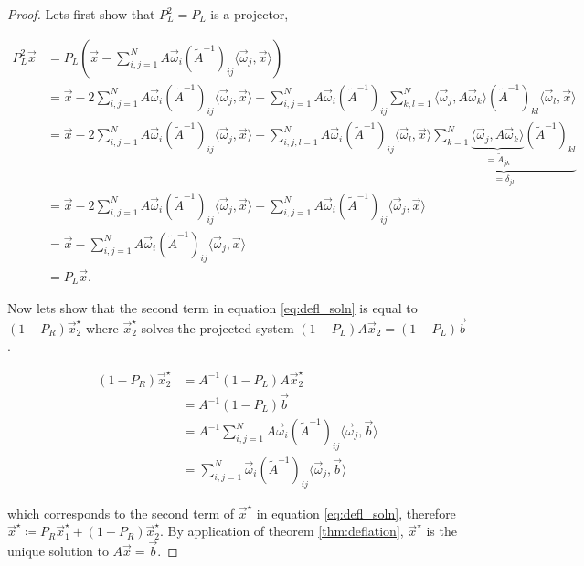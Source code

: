 \documentclass{article}
\theoremstyle{plain} %
\theoremstyle{convention} %
\theoremstyle{remark} %
\numberwithin{equation}{section}
\begin{document}
\begin{proof}

Lets first show that $P_L^2 = P_L$ is a projector,

\begin{align*}
    P_L^2 \vec{x} &= P_L \left( \vec{x} - \sum_{i,j=1}^N A \vec{\omega}_i (\widetilde{A}^{-1})_{ij} \langle \vec{\omega}_j, \vec{x} \rangle \right) \\
    &= \vec{x} - 2 \sum_{i,j=1}^N A \vec{\omega}_i (\widetilde{A}^{-1})_{ij} \langle \vec{\omega}_j, \vec{x} \rangle + \sum_{i,j=1}^N A \vec{\omega}_i (\widetilde{A}^{-1})_{ij} \sum_{k,l=1}^N \langle \vec{\omega}_j, A \vec{\omega}_k \rangle (\widetilde{A}^{-1})_{kl} \langle \vec{\omega}_l, \vec{x} \rangle \\
    &= \vec{x} - 2 \sum_{i,j=1}^N A \vec{\omega}_i (\widetilde{A}^{-1})_{ij} \langle \vec{\omega}_j, \vec{x} \rangle + \sum_{i,j,l=1}^N A \vec{\omega}_i (\widetilde{A}^{-1})_{ij} \langle \vec{\omega}_l, \vec{x} \rangle \underbrace{\sum_{k=1}^N \underbrace{\langle \vec{\omega}_j, A \vec{\omega}_k \rangle}_{= \widetilde{A}_{jk}} (\widetilde{A}^{-1})_{kl} }_{= \delta_{jl}} \\
    &= \vec{x} - 2 \sum_{i,j=1}^N A \vec{\omega}_i (\widetilde{A}^{-1})_{ij} \langle \vec{\omega}_j, \vec{x} \rangle + \sum_{i,j=1}^N A \vec{\omega}_i (\widetilde{A}^{-1})_{ij} \langle \vec{\omega}_j, \vec{x} \rangle \\
    &= \vec{x} - \sum_{i,j=1}^N A \vec{\omega}_i (\widetilde{A}^{-1})_{ij} \langle \vec{\omega}_j, \vec{x} \rangle \\
    &= P_L \vec{x}.
\end{align*}

Now lets show that the second term in equation \eqref{eq:defl_soln} is equal to $(1-P_R)\vec{x}^{\star}_2$ where $\vec{x}^{\star}_2$ solves the projected system $(1-P_L)A \vec{x}_2 = (1-P_L) \vec{b}$.

\begin{align*}
    (1-P_R)\vec{x}^{\star}_2 &= A^{-1} (1-P_L) A \vec{x}^{\star}_2 \\
    &= A^{-1} (1-P_L) \vec{b} \\
    &= A^{-1} \sum_{i,j=1}^N A \vec{\omega}_i (\widetilde{A}^{-1})_{ij} \langle \vec{\omega}_j, \vec{b} \rangle \\
    &= \sum_{i,j=1}^N \vec{\omega}_i (\widetilde{A}^{-1})_{ij} \langle \vec{\omega}_j, \vec{b} \rangle 
\end{align*}

which corresponds to the second term of $\vec{x}^{\star}$ in equation \eqref{eq:defl_soln}, therefore $\vec{x}^{\star} \coloneqq P_R \vec{x}^{\star}_1 + (1-P_R) \vec{x}^{\star}_2$. By application of theorem \ref{thm:deflation}, $\vec{x}^{\star}$ is the unique solution to $A\vec{x} = \vec{b}$.

\end{proof}
\end{document}

